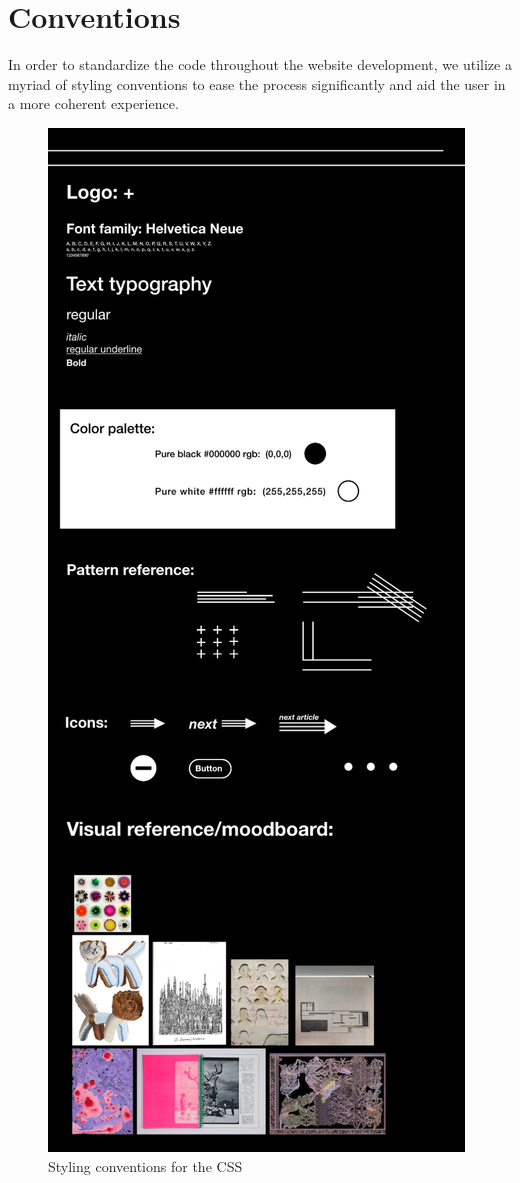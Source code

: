 \documentclass[a4paper,10pt]{article}
\begin{document}
\section{Conventions}
In order to standardize the code throughout the website development, we utilize a myriad of styling conventions to ease the process significantly and aid the user in a more coherent experience.
\vspace{1cm}
\begin{figure}[h!]
\includegraphics[height=0.52\paperheight, center]{conventions.jpeg}
\caption{Styling conventions for the CSS}
\end{figure}
\end{document}
